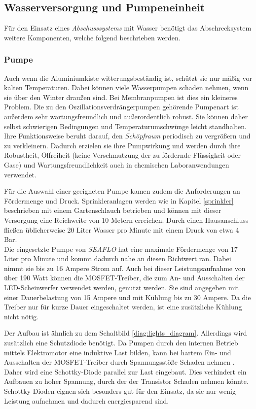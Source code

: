 \subsection{Wasserversorgung und Pumpeneinheit}

Für den Einsatz eines \textit{Abschusssystems} mit Wasser benötigt das Abschrecksystem weitere Komponenten, welche folgend beschrieben werden.

\subsubsection{Pumpe}

Auch wenn die Aluminiumkiste witterungsbeständig ist, schützt sie nur mäßig vor kalten Temperaturen. Dabei können viele Wasserpumpen schaden nehmen, wenn sie über den Winter draußen sind. Bei Membranpumpen ist dies ein kleineres Problem. Die zu den Oszillationsverdrängerpumpen gehörende Pumpenart ist außerdem sehr wartungsfreundlich und außerordentlich robust. Sie können daher selbst schwierigen Bedingungen und Temperaturumschwünge leicht standhalten.
\\
Ihre Funktionsweise beruht darauf, den \textit{Schöpfraum} periodisch zu vergrößern und zu verkleinern. Dadurch erzielen sie ihre Pumpwirkung und werden durch ihre Robustheit, Ölfreiheit (keine Verschmutzung der zu fördernde Flüssigkeit oder Gase) und Wartungsfreundlichkeit auch in chemischen Laboranwendungen verwendet. \cite{Jousten2018}

Für die Auswahl einer geeigneten Pumpe kamen zudem die Anforderungen an Fördermenge und Druck. Sprinkleranlagen werden wie in Kapitel \ref{sprinkler} beschrieben mit einem Gartenschlauch betrieben und können mit dieser Versorgung eine Reichweite von 10 Metern erreichen. Durch einen Hausanschluss fließen üblicherweise 20 Liter Wasser pro Minute mit einem Druck von etwa 4 Bar.\\
Die eingesetzte Pumpe von \textit{SEAFLO} hat eine maximale Fördermenge von 17 Liter pro Minute und kommt dadurch nahe an diesen Richtwert ran. Dabei nimmt sie bis zu 16 Ampere Strom auf. Auch bei dieser Leistungsaufnahme von über 190 Watt können die MOSFET-Treiber, die zum An- und Ausschalten der LED-Scheinwerfer verwendet werden, genutzt werden. Sie sind angegeben mit einer Dauerbelastung von 15 Ampere und mit Kühlung bis zu 30 Ampere. Da die Treiber nur für kurze Dauer eingeschaltet werden, ist eine zusätzliche Kühlung nicht nötig. \cite{mosfets_am,seaflo_pump}

Der Aufbau ist ähnlich zu dem Schaltbild \ref{diag:lights_diagram}. Allerdings wird zusätzlich eine Schutzdiode benötigt. Da Pumpen durch den internen Betrieb mittels Elektromotor eine induktive Last bilden, kann bei hartem Ein- und Ausschalten der MOSFET-Treiber durch Spannungsstöße Schaden nehmen \cite{induktive_last_diode}. Daher wird eine Schottky-Diode parallel zur Last eingebaut. Dies verhindert ein Aufbauen zu hoher Spannung, durch der der Transistor Schaden nehmen könnte. Schottky-Dioden eignen sich besonders gut für den Einsatz, da sie nur wenig Leistung aufnehmen und dadurch energiesparend sind. \cite{induktive_last_diode,am_schottky}

